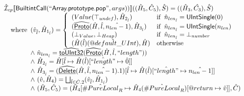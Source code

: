 \documentclass{article}
\makeatletter
\newcommand{\SF}[1]{\mbox{\textsf{#1}}}
\newcommand{\wherec}[1]{{\rm where}\begin{array}[t]{l}#1\end{array}}
\newcommand{\ifc}[1]{{\rm if}\begin{array}[t]{l}#1\end{array}}
\newcommand{\owc}{{\rm otherwise}}
\newcommand{\aI}{\hat{\mathcal{I}}}
\newcommand{\lbr}{\llbracket}
\newcommand{\rbr}{\rrbracket}
\newcommand{\ahf}[1]{\widehat{\underline{\sf #1}}}
\newcommand{\varprop}[1]{@#1}
\newcommand{\avarloc}[1]{\hat{\##1}}
\newcommand{\avarprop}[1]{\hat{@#1}}
\makeatother
\begin{document}
\[
\begin{array}{ll}



\aI _{cp}\lbr \SF{BuiltintCall}(``\SF{Array.prototype.pop}",args))\rbr((\hat{H}_5,\hat{C}_5), \hat{S})
  = ((\hat{H}_3, \hat{C_3}), \hat{S})\\
\quad\wherec{
  (\hat{v}_{\hat{l}}, \hat{H}_{1_{\hat{l}}}) = \left\{\begin{array}{ll}
      (Value(\top_{undef}),\hat{H}_{2_{\hat{l}}}) & \ifc{\hat{n}_{len_{\hat{l}}} = \SF{UIntSingle}(0)}\\
      (\ahf{Proto}(\hat{H}, \hat{l}, \hat{n_{len}-1}),\hat{H}_{3_{\hat{l}}}) & \ifc{\hat{n}_{len_{\hat{l}}} = \SF{UIntSingle}(n_{len})}\\
      (\bot_{Value}, \bot_{Heap}) & \ifc{\hat{n}_{len_{\hat{l}}} = \bot_{number}}\\
      (\hat{H}(\hat{l})(\avarprop{default\_UInt}), \hat{H}) & \owc
    \end{array}\right.\\
  \land\ \hat{n}_{len_{\hat{l}}} = \ahf{toUInt32}(\ahf{Proto}(\hat{H}, \hat{l}, ``length"))\\
  \land\ \hat{H}_{2_{\hat{l}}} = \hat{H}[\hat{l} \mapsto \hat{H}(\hat{l})[\hat{``length"} \mapsto \hat{0}]]\\
  \land\ \hat{H}_{3_{\hat{l}}} = (\ahf{Delete}(\hat{H}, \hat{l}, \hat{n_{len}-1}).1)[\hat{l} \mapsto \hat{H}(\hat{l})[\hat{``length"} \mapsto \hat{n_{len}-1}]]\\
  \land\ (\hat{v}, \hat{H}_4) = \bigsqcup_{\hat{l} \in \hat{C}.2} (\hat{v}_{\hat{l}}, \hat{H}_{1_{\hat{l}}})\\
  \land\ (\hat{H}_5, \hat{C}_5) = 
      (\hat{H}_4[\avarloc{PureLocal}_R \mapsto \hat{H}_4(\avarloc{PureLocal}_R)[\varprop{return} \mapsto \hat{v}]], \hat{C})\\
  }\\
\\\\



\end{array}\]
\end{document}
